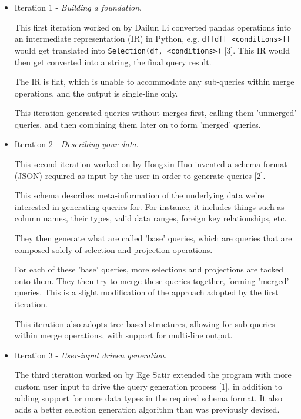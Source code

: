 \documentclass[10pt, twocolumn]{article}
\begin{document}
\spacing
\begin{itemize}
    \item Iteration 1 - \textit{Building a foundation}.

    \spacing
    This first iteration worked on by Dailun Li converted pandas operations into an intermediate
    representation (IR) in Python, e.g. \texttt{df[df[ <conditions>]]} would get translated into \texttt{Selection(df, <conditions>)} [3]. This IR would then get converted into a string, the final query result.

    \spacing
    The IR is flat, which is unable to accommodate any sub-queries within merge operations, and the output is single-line only.

    \spacing
    This iteration generated queries without merges first, calling them 'unmerged' queries, and then combining them later on to form 'merged' queries.
    \spacing

    \item Iteration 2 - \textit{Describing your data}.

    \spacing
    This second iteration worked on by Hongxin Huo invented a schema format (JSON) required as input by the user in order to generate queries [2].

    \spacing
    This schema describes meta-information of the underlying data we're interested in generating queries for. For instance, it includes things such as column names, their types, valid data ranges, foreign key relationships, etc.

    \spacing
    They then generate what are called 'base' queries, which are queries that are composed solely of selection and projection operations.

    \spacing
    For each of these 'base' queries, more selections and projections are tacked onto them. They then try to merge these queries together, forming 'merged' queries. This is a slight modification of the approach adopted by the first iteration.

    \spacing
    This iteration also adopts tree-based structures, allowing for sub-queries within merge operations, with support for multi-line output.
    \spacing

    \item Iteration 3 - \textit{User-input driven generation}.

    \spacing
     The third iteration worked on by Ege Satir extended the program with more custom user input
     to drive the query generation process [1], in addition to adding support
     for more data types in the required schema format. It also adds a better selection generation algorithm than was previously devised.
\end{itemize}
\end{document}
